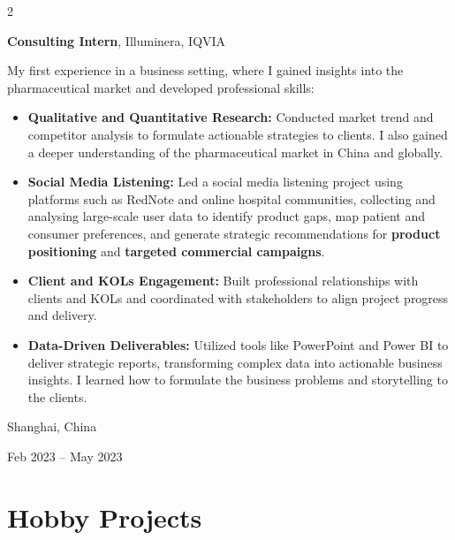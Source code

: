 \documentclass[10pt, letterpaper]{article}
\newenvironment{highlights}{
    \begin{itemize}[
        topsep=0.10 cm,
        parsep=0.10 cm,
        partopsep=0pt,
        itemsep=0pt,
        leftmargin=0.4 cm + 10pt
    ]
}{
    \end{itemize}
}
\newenvironment{twocolentry}[2][]{
    \onecolentry
    \def\secondColumn{#2}
    \setcolumnwidth{\fill, 4.5 cm}
    \begin{paracol}{2}
}{
    \switchcolumn \raggedleft \secondColumn
    \end{paracol}
    \endonecolentry
}
\begin{document}
        \begin{twocolentry}{
    Shanghai, China

    Feb 2023 -- May 2023
}
    \textbf{Consulting Intern}, Illuminera, IQVIA

    \vspace{0.1cm}

    My first experience in a business setting, where I gained insights into the pharmaceutical market and developed professional skills:

    \begin{highlights}
        \item \textbf{Qualitative and Quantitative Research:} Conducted market trend and competitor analysis to formulate actionable strategies to clients. I also gained a deeper understanding of the pharmaceutical market in China and globally.

        \vspace{0.1cm}

        \item \textbf{Social Media Listening:} Led a social media listening project using platforms such as RedNote and online hospital communities, collecting and analysing large-scale user data to identify product gaps, map patient and consumer preferences, and generate strategic recommendations for \textbf{product positioning} and \textbf{targeted commercial campaigns}.

        \vspace{0.1cm}

        \item \textbf{Client and KOLs Engagement:} Built professional relationships with clients and KOLs and coordinated with stakeholders to align project progress and delivery.

        \vspace{0.1cm}

        \item \textbf{Data-Driven Deliverables:} Utilized tools like PowerPoint and Power BI to deliver strategic reports, transforming complex data into actionable business insights. I learned how to formulate the business problems and storytelling to the clients.
    \end{highlights}
\end{twocolentry}

        \vspace{0.3 cm}


    \section{Hobby Projects}
\end{document}
